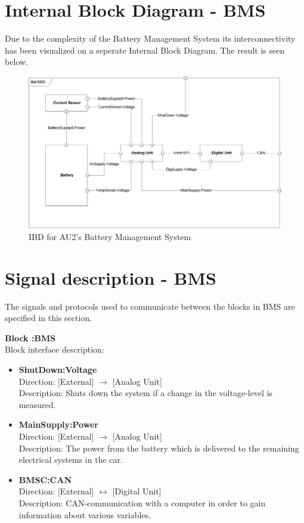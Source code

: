 \section{Internal Block Diagram - BMS}
Due to the complexity of the Battery Management System its interconnectivity has been visualized on a seperate Internal Block Diagram. The result is seen below.

\begin{figure}[H]
	\centering
	\includegraphics[width=1\linewidth]{Architecture/Diagrams/IBD_BMS}
	\caption{IBD for AU2's Battery Management System}
	\label{fig:IBD_BMS}
\end{figure}

\section{Signal description - BMS}
The signals and protocols used to communicate between the blocks in BMS are specified in this section.

\textbf{Block :BMS}\\
Block interface description:
\begin{itemize}
	\item \textbf{ShutDown:Voltage}\\
	Direction: [External] $\rightarrow$ [Analog Unit]\\
	Description: Shuts down the system if a change in the voltage-level is measured.
	\item \textbf{MainSupply:Power}\\
	Direction: [External] $\rightarrow$ [Analog Unit]\\
	Description: The power from the battery which is delivered to the remaining electrical systems in the car.
	\item \textbf{BMSC:CAN}\\
	Direction: [External] $\leftrightarrow$ [Digital Unit]\\
	Description: CAN-communication with a computer in order to gain information about various variables.
\end{itemize}

